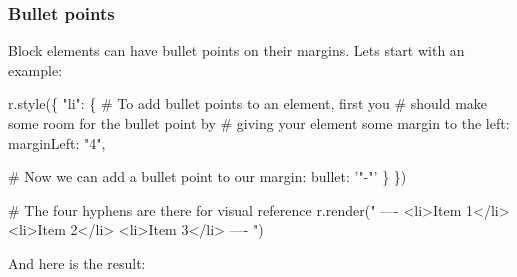 \subsubsection*{Bullet points}

Block elements can have bullet points on their margins. Let\textquotesingle{}s start with an example\+: 
\begin{DoxyCode}
r.style(\{
  "li": \{
    # To add bullet points to an element, first you
    # should make some room for the bullet point by
    # giving your element some margin to the left:
    marginLeft: "4",

    # Now we can add a bullet point to our margin:
    bullet: '"-"'
  \}
\})

# The four hyphens are there for visual reference
r.render("
----
<li>Item 1</li>
<li>Item 2</li>
<li>Item 3</li>
----
")
\end{DoxyCode}
 And here is the result\+:

 